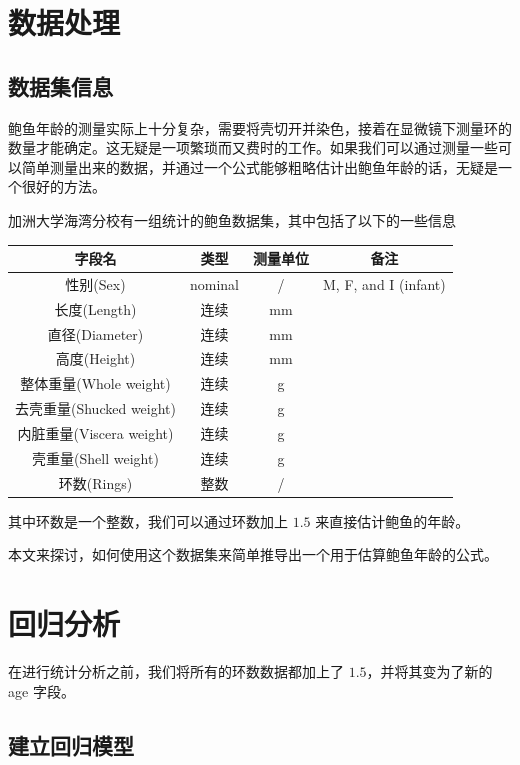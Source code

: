 \section{数据处理}

\subsection{数据集信息}

鲍鱼年龄的测量实际上十分复杂，需要将壳切开并染色，接着在显微镜下测量环的数量才能确定。这无疑是一项繁琐而又费时的工作。如果我们可以通过测量一些可以简单测量出来的数据，并通过一个公式能够粗略估计出鲍鱼年龄的话，无疑是一个很好的方法。

加洲大学海湾分校有一组统计的鲍鱼数据集，其中包括了以下的一些信息

\begin{center}
  \begin{tabular}{c c c c}
    \hline
    \hline
    \textbf{字段名} & \textbf{类型} & \textbf{测量单位} & \textbf{备注} \\
    \hline
    性别(Sex) & nominal & / & M, F, and I (infant) \\
    长度(Length) & 连续 & mm & \\
    直径(Diameter) & 连续 & mm & \\
    高度(Height) & 连续 & mm & \\
    整体重量(Whole weight) & 连续 & g & \\
    去壳重量(Shucked weight) & 连续 & g & \\
    内脏重量(Viscera weight) & 连续 & g & \\
    壳重量(Shell weight) & 连续 & g & \\
    环数(Rings) & 整数 & / & \\
    \hline
    \hline
  \end{tabular}
\end{center}

其中环数是一个整数，我们可以通过环数加上 $1.5$ 来直接估计鲍鱼的年龄。

本文来探讨，如何使用这个数据集来简单推导出一个用于估算鲍鱼年龄的公式。

\section{回归分析}

在进行统计分析之前，我们将所有的环数数据都加上了 $1.5$，并将其变为了新的 age 字段。

\subsection{建立回归模型}

